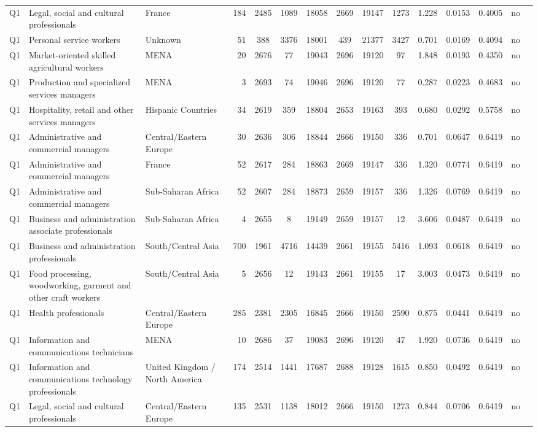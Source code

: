 \begin{longtable}{lllrcccccccccll}
Q1 & Legal, social and cultural professionals & France & 184 & 2485 & 1089 & 18058 & 2669 & 19147 & 1273 & 1.228 & 0.0153 & 0.4005 & no \\
Q1 & Personal service workers & Unknown & 51 & 388 & 3376 & 18001 & 439 & 21377 & 3427 & 0.701 & 0.0169 & 0.4094 & no \\
Q1 & Market-oriented skilled agricultural workers & MENA & 20 & 2676 & 77 & 19043 & 2696 & 19120 & 97 & 1.848 & 0.0193 & 0.4350 & no \\
Q1 & Production and specialized services managers & MENA & 3 & 2693 & 74 & 19046 & 2696 & 19120 & 77 & 0.287 & 0.0223 & 0.4683 & no \\
Q1 & Hospitality, retail and other services managers & Hispanic Countries & 34 & 2619 & 359 & 18804 & 2653 & 19163 & 393 & 0.680 & 0.0292 & 0.5758 & no \\
Q1 & Administrative and commercial managers & Central/Eastern Europe & 30 & 2636 & 306 & 18844 & 2666 & 19150 & 336 & 0.701 & 0.0647 & 0.6419 & no \\
Q1 & Administrative and commercial managers & France & 52 & 2617 & 284 & 18863 & 2669 & 19147 & 336 & 1.320 & 0.0774 & 0.6419 & no \\
Q1 & Administrative and commercial managers & Sub-Saharan Africa & 52 & 2607 & 284 & 18873 & 2659 & 19157 & 336 & 1.326 & 0.0769 & 0.6419 & no \\
Q1 & Business and administration associate professionals & Sub-Saharan Africa & 4 & 2655 & 8 & 19149 & 2659 & 19157 & 12 & 3.606 & 0.0487 & 0.6419 & no \\
Q1 & Business and administration professionals & South/Central Asia & 700 & 1961 & 4716 & 14439 & 2661 & 19155 & 5416 & 1.093 & 0.0618 & 0.6419 & no \\
Q1 & Food processing, woodworking, garment and other craft workers & South/Central Asia & 5 & 2656 & 12 & 19143 & 2661 & 19155 & 17 & 3.003 & 0.0473 & 0.6419 & no \\
Q1 & Health professionals & Central/Eastern Europe & 285 & 2381 & 2305 & 16845 & 2666 & 19150 & 2590 & 0.875 & 0.0441 & 0.6419 & no \\
Q1 & Information and communications technicians & MENA & 10 & 2686 & 37 & 19083 & 2696 & 19120 & 47 & 1.920 & 0.0736 & 0.6419 & no \\
Q1 & Information and communications technology professionals & United Kingdom / North America & 174 & 2514 & 1441 & 17687 & 2688 & 19128 & 1615 & 0.850 & 0.0492 & 0.6419 & no \\
Q1 & Legal, social and cultural professionals & Central/Eastern Europe & 135 & 2531 & 1138 & 18012 & 2666 & 19150 & 1273 & 0.844 & 0.0706 & 0.6419 & no \\

\end{longtable}
